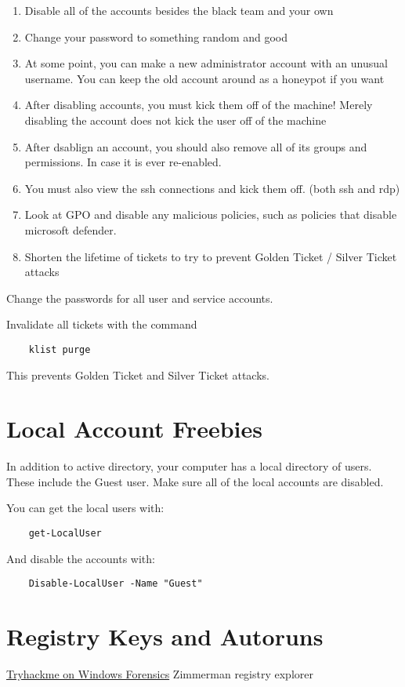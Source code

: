 \documentclass{article}
\begin{document}
\begin{enumerate}
        \item Disable all of the accounts besides the black team and your own
        \item Change your password to something random and good
        \item At some point, you can make a new administrator account with an unusual username. You can keep the old account around as a honeypot if you want
        \item After disabling accounts, you must kick them off of the machine! Merely disabling the account does not kick the user off of the machine
        \item After dsablign an account, you should also remove all of its groups and permissions. In case it is ever re-enabled.
        \item You must also view the ssh connections and kick them off. (both ssh and rdp)
        \item Look at GPO and disable any malicious policies, such as policies that disable microsoft defender.
        \item Shorten the lifetime of tickets to try to prevent Golden Ticket / Silver Ticket attacks
\end{enumerate}

Change the passwords for all user and service accounts.

Invalidate all tickets with the command 
\begin{lstlisting}
    klist purge
\end{lstlisting}
This prevents Golden Ticket and Silver Ticket attacks.


\section{Local Account Freebies}
In addition to active directory, your computer has a local directory of users. These include the Guest user.
Make sure all of the local accounts are disabled.

You can get the local users with:
\begin{lstlisting}
    get-LocalUser
\end{lstlisting}
And disable the accounts with: 
\begin{lstlisting}
    Disable-LocalUser -Name "Guest"
\end{lstlisting}

\section{Registry Keys and Autoruns}
\href{https://tryhackme.com/room/windowsforensics1}{Tryhackme on Windows Forensics}
Zimmerman registry explorer
\end{document}
